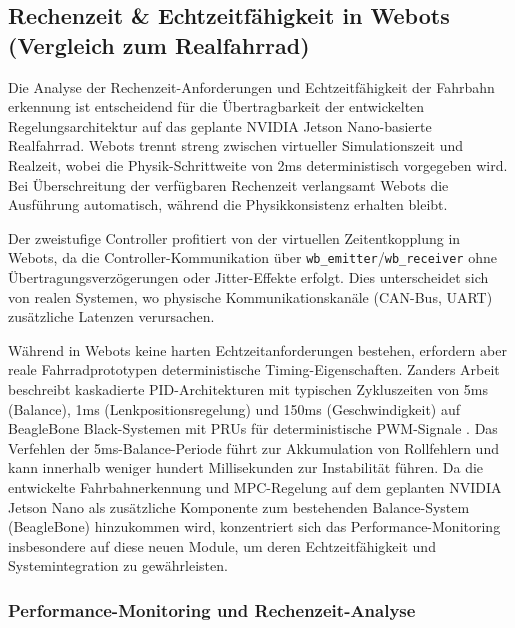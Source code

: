   

  \newpage
 


\subsection{Rechenzeit \& Echtzeitfähigkeit in Webots (Vergleich zum Realfahrrad)}
\label{sec:rechenzeit-echtzeit}

Die Analyse der Rechenzeit-Anforderungen und Echtzeitfähigkeit der Fahrbahn erkennung ist entscheidend 
für die Übertragbarkeit der entwickelten Regelungsarchitektur auf das geplante 
NVIDIA Jetson Nano-basierte Realfahrrad. Webots trennt streng zwischen virtueller 
Simulationszeit und Realzeit, wobei die Physik-Schrittweite von 2ms deterministisch 
vorgegeben wird. Bei Überschreitung der verfügbaren Rechenzeit verlangsamt Webots 
die Ausführung automatisch, während die Physikkonsistenz erhalten bleibt.

Der zweistufige Controller profitiert von der virtuellen Zeitentkopplung in 
Webots, da die Controller-Kommunikation über \texttt{wb\_emitter}/\texttt{wb\_receiver} 
ohne Übertragungsverzögerungen oder Jitter-Effekte erfolgt. Dies unterscheidet 
sich von realen Systemen, wo physische Kommunikationskanäle (CAN-Bus, UART) 
zusätzliche Latenzen verursachen.

Während in Webots keine harten Echtzeitanforderungen bestehen, erfordern aber reale Fahrradprototypen deterministische 
Timing-Eigenschaften. Zanders Arbeit beschreibt kaskadierte PID-Architekturen mit typischen Zykluszeiten von 5ms (Balance), 1ms (Lenkpositionsregelung) und 150ms 
(Geschwindigkeit) auf BeagleBone Black-Systemen mit PRUs für deterministische PWM-Signale \citep{zander2023}. Das Verfehlen der 5ms-Balance-Periode führt zur Akkumulation von Rollfehlern 
und kann innerhalb weniger hundert Millisekunden zur Instabilität führen. Da die entwickelte Fahrbahnerkennung und MPC-Regelung auf dem geplanten NVIDIA Jetson Nano als zusätzliche Komponente zum bestehenden Balance-System (BeagleBone) hinzukommen wird, konzentriert sich das Performance-Monitoring insbesondere auf diese neuen Module, um deren Echtzeitfähigkeit und Systemintegration zu gewährleisten.

\subsubsection{Performance-Monitoring und Rechenzeit-Analyse}
\label{sec:performance-monitoring}

